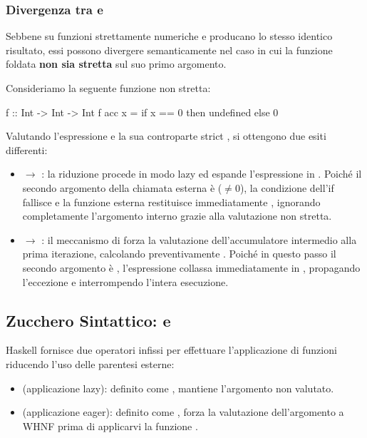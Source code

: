 \subsubsection{Divergenza tra  e }
Sebbene su funzioni strettamente numeriche  e  producano lo stesso identico risultato, essi possono divergere semanticamente nel caso in cui la funzione foldata \textbf{non sia stretta} sul suo primo argomento.

Consideriamo la seguente funzione non stretta:
\begin{haskellbox}{}
f :: Int -> Int -> Int
f acc x = if x == 0 then undefined else 0
\end{haskellbox}
Valutando l'espressione  e la sua controparte strict , si ottengono due esiti differenti:
\begin{itemize}
    \item {} $\rightarrow$ : la riduzione procede in modo lazy ed espande l'espressione in . Poiché il secondo argomento della chiamata esterna è  ($\neq 0$), la condizione dell'if fallisce e la funzione esterna restituisce immediatamente , ignorando completamente l'argomento interno  grazie alla valutazione non stretta.
    \item {} $\rightarrow$ : il meccanismo di  forza la valutazione dell'accumulatore intermedio alla prima iterazione, calcolando preventivamente . Poiché in questo passo il secondo argomento è , l'espressione collassa immediatamente in , propagando l'eccezione e interrompendo l'intera esecuzione.
\end{itemize}

\subsection{Zucchero Sintattico: \code{\$} e \code{\$!}}
Haskell fornisce due operatori infissi per effettuare l'applicazione di funzioni riducendo l'uso delle parentesi esterne:
\begin{itemize}
    \item \textbf{\code{\$}} (applicazione lazy): definito come , mantiene l'argomento non valutato.
    \item \textbf{\code{\$!}} (applicazione eager): definito come , forza la valutazione dell'argomento a WHNF prima di applicarvi la funzione .
\end{itemize}

